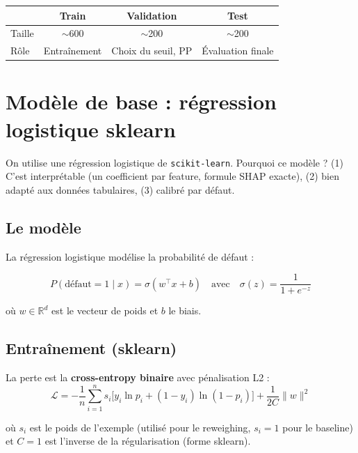 \documentclass[11pt, a4paper]{article}
\begin{document}
\begin{table}[H]
\centering
\begin{tabular}{lccc}
\toprule
& \textbf{Train} & \textbf{Validation} & \textbf{Test} \\
\midrule
Taille & $\sim$600 & $\sim$200 & $\sim$200 \\
R\^{o}le & Entra\^{i}nement & Choix du seuil, PP & \'{E}valuation finale \\
\bottomrule
\end{tabular}
\end{table}

\section{Mod\`{e}le de base : r\'{e}gression logistique sklearn}
\label{sec:model}

\begin{questionbox}
On utilise une r\'{e}gression logistique de \texttt{scikit-learn}. Pourquoi ce mod\`{e}le ? (1) C'est interpr\'{e}table (un coefficient par feature, formule SHAP exacte), (2) bien adapt\'{e} aux donn\'{e}es tabulaires, (3) calibr\'{e} par d\'{e}faut.
\end{questionbox}

\subsection{Le mod\`{e}le}

La r\'{e}gression logistique mod\'{e}lise la probabilit\'{e} de d\'{e}faut :

$$P(\text{d\'{e}faut}=1 \mid x) = \sigma(w^\top x + b) \quad \text{avec} \quad \sigma(z) = \frac{1}{1 + e^{-z}}$$

\noindent o\`{u} $w \in \mathbb{R}^d$ est le vecteur de poids et $b$ le biais.

\subsection{Entra\^{i}nement (sklearn)}

La perte est la \textbf{cross-entropy binaire} avec p\'{e}nalisation L2 :
$$\mathcal{L} = -\frac{1}{n}\sum_{i=1}^{n} s_i \Big[ y_i \ln p_i + (1-y_i) \ln(1 - p_i) \Big] + \frac{1}{2C} \|w\|^2$$

\noindent o\`{u} $s_i$ est le poids de l'exemple (utilis\'{e} pour le reweighing, $s_i = 1$ pour le baseline) et $C = 1$ est l'inverse de la r\'{e}gularisation (forme sklearn).
\end{document}
